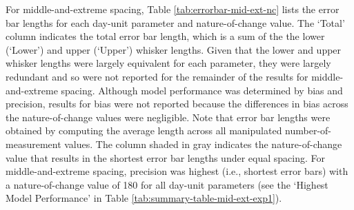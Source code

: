 \documentclass[
12pt, %
twoside,
english]{guelphthesis}
\begin{document}
For middle-and-extreme spacing, Table \ref{tab:errorbar-mid-ext-nc} lists the error bar lengths for each day-unit parameter and nature-of-change value. The `Total' column indicates the total error bar length, which is a sum of the the lower (`Lower') and upper (`Upper') whisker lengths. Given that the lower and upper whisker lengths were largely equivalent for each parameter, they were largely redundant and so were not reported for the remainder of the results for middle-and-extreme spacing. Although model performance was determined by bias and precision, results for bias were not reported because the differences in bias across the nature-of-change values were negligible. Note that error bar lengths were obtained by computing the average length across all manipulated number-of-measurement values. The column shaded in gray indicates the nature-of-change value that results in the shortest error bar lengths under equal spacing. For middle-and-extreme spacing, precision was highest (i.e., shortest error bars) with a nature-of-change value of 180 for all day-unit parameters (see the `Highest Model Performance' in Table \ref{tab:summary-table-mid-ext-exp1}).
\end{document}
